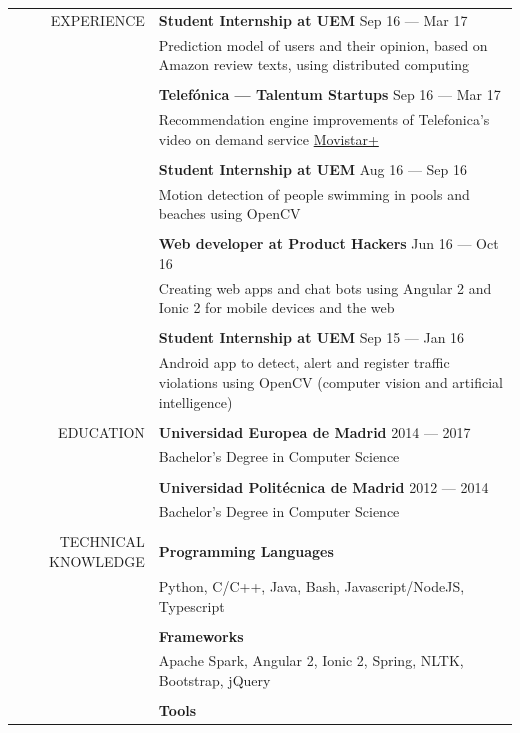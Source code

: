 \documentclass[a4paper, 11pt]{article}
\begin{document}
\begin{longtable}{rp{11cm}}
    EXPERIENCE
    & {\bf Student Internship at UEM} \hfill Sep 16 --- Mar 17\\
    & Prediction model of users and their opinion, based on Amazon review texts, using distributed computing\\
    \\
    & {\bf Telefónica --- Talentum Startups} \hfill Sep 16 --- Mar 17\\
    & Recommendation engine improvements of Telefonica's video on demand service \href{http://ver.movistarplus.es/}{Movistar+}\\
    \\
    & {\bf Student Internship at UEM} \hfill Aug 16 --- Sep 16\\
    & Motion detection of people swimming in pools and beaches using OpenCV\\
    \\
    & {\bf Web developer at Product Hackers} \hfill Jun 16 --- Oct 16\\
    & Creating web apps and chat bots using Angular 2 and Ionic 2 for mobile devices and the web\\
    \\
    & {\bf Student Internship at UEM} \hfill Sep 15 --- Jan 16\\
    & Android app to detect, alert and register traffic violations using OpenCV (computer vision and artificial intelligence)\\
    \\
    EDUCATION
    & {\bf Universidad Europea de Madrid} \hfill 2014 --- 2017\\
    & Bachelor's Degree in Computer Science\\
    \\
    & {\bf Universidad Politécnica de Madrid} \hfill 2012 --- 2014\\
    & Bachelor's Degree in Computer Science\\ 
    \\
    TECHNICAL KNOWLEDGE
    & {\bf Programming Languages}\\
    & Python, C/C++, Java, Bash, Javascript/NodeJS, Typescript\\
    \\
    & {\bf Frameworks}\\
    & Apache Spark, Angular 2, Ionic 2, Spring, NLTK, Bootstrap, jQuery\\
    \\
    & {\bf Tools}\\

\end{longtable}
\end{document}
